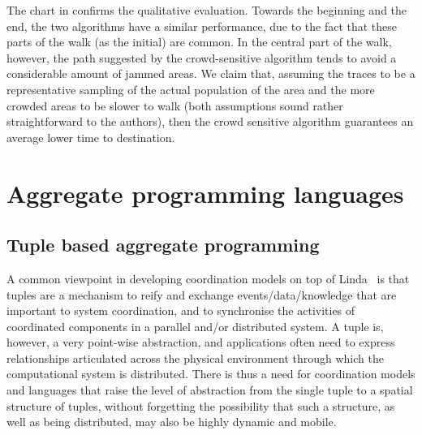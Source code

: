 \documentclass[12pt,a4paper,twoside,openright]{book}
\begin{document}
The chart in  confirms the qualitative evaluation.
%
Towards the beginning and the end, the two algorithms have a similar performance, due to the fact that these parts of the walk (as the initial) are common.
%
In the central part of the walk, however, the path suggested by the crowd-sensitive algorithm tends to avoid a considerable amount of jammed areas.
%
We claim that, assuming the traces to be a representative sampling of the actual population of the area and the more crowded areas to be slower to walk (both assumptions sound rather straightforward to the authors), then the crowd sensitive algorithm guarantees an average lower time to destination.

\part{Aggregate programming languages}
\chapter{Tuple based aggregate programming}

A common viewpoint in developing coordination models on top of Linda~\cite{linda-toplas7} is that tuples are a mechanism to reify and exchange events/data/knowledge that are important to system coordination, and to synchronise the activities of coordinated components in a parallel and/or distributed system.
%
A tuple is, however, a very point-wise abstraction, and applications often need to express relationships articulated across the physical environment through which the computational system is distributed.
%
There is thus a need for coordination models and languages that raise the level of abstraction from the single tuple to a spatial structure of tuples, without forgetting the possibility that such a structure, as well as being distributed, may also be highly dynamic and mobile.
\end{document}

